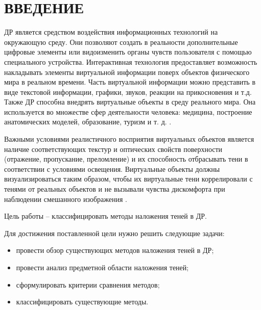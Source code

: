 \chapter*{ВВЕДЕНИЕ}

ДР является средством воздействия информационных технологий на окружающую среду. Они позволяют создать в реальности дополнительные цифровые элементы или видоизменить органы чувств пользователя с помощью специального устройства. Интерактивная технология предоставляет возможность накладывать элементы виртуальной информации поверх объектов физического мира в реальном времени. Часть виртуальной информации можно представить в виде текстовой информации, графики, звуков, реакции на прикосновения и т.д. Также ДР способна внедрять виртуальные объекты в среду реального мира. Она используется во множестве сфер деятельности человека: медицина, построение анатомических моделей, образование, туризм и т. д. \cite{tech-ar}.

Важными условиями реалистичного восприятия виртуальных объектов является наличие соответствующих текстур и оптических свойств поверхности (отражение, пропускание, преломление) и их способность отбрасывать тени в соответствии с условиями освещения. Виртуальные объекты должны визуализироваться таким образом, чтобы их виртуальные тени коррелировали с тенями от реальных объектов и не вызывали чувства дискомфорта при наблюдении смешанного изображения \cite{bogdanov}.

Цель работы -- классифицировать методы наложения теней в ДР.

Для достижения поставленной цели нужно решить следующие задачи:

\begin{itemize}
	\item провести обзор существующих методов наложения теней в ДР;
	\item провести анализ предметной области наложения теней;
	\item сформулировать критерии сравнения методов;
	\item классифицировать существующие методы.
\end{itemize}